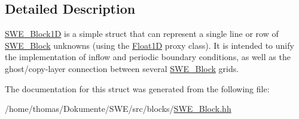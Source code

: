 \subsection{Detailed Description}
\hyperlink{structSWE__Block1D}{S\-W\-E\-\_\-\-Block1\-D} is a simple struct that can represent a single line or row of \hyperlink{classSWE__Block}{S\-W\-E\-\_\-\-Block} unknowns (using the \hyperlink{classFloat1D}{Float1\-D} proxy class). It is intended to unify the implementation of inflow and periodic boundary conditions, as well as the ghost/copy-\/layer connection between several \hyperlink{classSWE__Block}{S\-W\-E\-\_\-\-Block} grids. 

The documentation for this struct was generated from the following file\-:\begin{DoxyCompactItemize}
\item 
/home/thomas/\-Dokumente/\-S\-W\-E/src/blocks/\hyperlink{SWE__Block_8hh}{S\-W\-E\-\_\-\-Block.\-hh}\end{DoxyCompactItemize}

